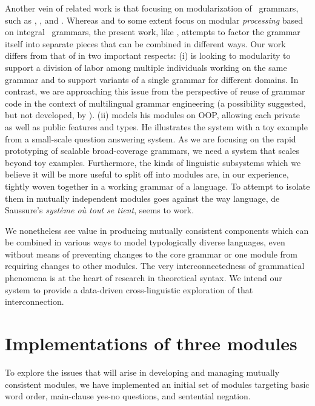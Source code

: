 Another vein of related work is that focusing on modularization of
\hpsg\ grammars, such as ,
, and . Whereas
\citeauthor{Kasper:Krieger:96} and to some extent
\citeauthor{Theofilidis:etal:97} focus on modular {\it processing}
based on integral \hpsg\ grammars, the present work, like
, attempts to factor the grammar itself into
separate pieces that can be combined in different ways.  Our work
differs from that of \citeauthor{Keselj:01} in two important respects:
(i) \citeauthor{Keselj:01} is looking to modularity to support a
division of labor among multiple individuals working on the same
grammar and to support variants of a single grammar for different
domains.  In contrast, we are approaching this issue from the
perspective of reuse of grammar code in the context of multilingual
grammar engineering (a possibility suggested, but not developed, by
). (ii) \citeauthor{Keselj:01} models
his modules on OOP, allowing each private as well as public features
and types.  He illustrates the system with a toy example from a
small-scale question answering system.  As we are focusing on the
rapid prototyping of scalable broad-coverage grammars, we need 
a system that scales beyond toy examples.  Furthermore, the kinds
of linguistic subsystems which we believe it will be more useful
to split off into modules are, in our experience, tightly woven
together in a working grammar of a language.  To attempt to isolate
them in mutually independent modules goes against the way language,
de Saussure's {\it syst\`eme o\`u tout se tient}, seems to work.

We nonetheless see value in producing mutually consistent
components which can be combined in various ways to model
typologically diverse languages, even without means of 
preventing changes to the core grammar or one module from requiring
changes to other modules.  The very interconnectedness of grammatical
phenomena is at the heart of research in theoretical syntax.  We
intend our system to provide a data-driven cross-linguistic
exploration of that interconnection.

\section{Implementations of three modules}
\label{imp}

To explore the issues that will arise in developing and managing
mutually consistent modules, we have
implemented an initial set of modules targeting basic
word order, main-clause yes-no questions, and sentential negation.  

